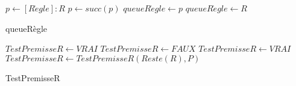 \documentclass{article}
\begin{document}
\begin{algorithm}
    \SetAlgoLined
    \KwResult{[Proposition]}
    
    \begin{algorithmic}
        \STATE $p \gets [R\grave{e}gle] : R$
                \STATE $p \gets succ(p)$
            \ENDWHILE
            \STATE $queueR\grave{e}gle \gets p$
        \ELSE
            \STATE $queueR\grave{e}gle \gets R$
        \ENDIF
      
    \end{algorithmic}
    \caption{queueRègle} 
\end{algorithm}
\clearpage
\begin{algorithm}
    \SetAlgoLined 
    
    \begin{algorithmic}
    
            \STATE $TestPremisseR \gets VRAI$
        \ENDIF
            \STATE $TestPremisseR \gets FAUX$
        \ELSE
                \STATE $TestPremisseR \gets VRAI$
            \ELSE
                \STATE $TestPremisseR \gets TestPremisseR(Reste(R),P)$
            \ENDIF
        \ENDIF

        
    \end{algorithmic}
    \caption{TestPremisseR}
\end{algorithm}
\clearpage
\end{document}
